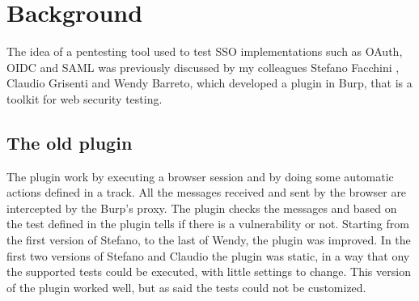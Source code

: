 \chapter{Background} %
\label{Background}


The idea of a pentesting tool used to test SSO implementations such as OAuth, OIDC and SAML was previously discussed by my colleagues Stefano Facchini \cite{stefano_faccini}, Claudio Grisenti and Wendy Barreto, which developed a plugin in Burp, that is a toolkit for web security testing.\\

\section{The old plugin}
The plugin work by executing a browser session and by doing some automatic actions defined in a track. All the messages received and sent by the browser are intercepted by the Burp's proxy. The plugin checks the messages and based on the test defined in the plugin tells if there is a vulnerability or not.
Starting from the first version of Stefano, to the last of Wendy, the plugin was improved. In the first two versions of Stefano and Claudio the plugin was static, in a way that ony the supported tests could be executed, with little settings to change. This version of the plugin worked well, but as said the tests could not be customized.

